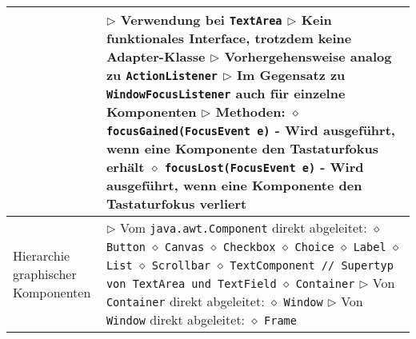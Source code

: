 \begin{longtable}{ | p{} p{} | }
	\makecell[l]{Interface FocusListener} & \makecell[l]{
	$\rhd$ Verwendung bei \texttt{TextArea} \\
	$\rhd$ Kein funktionales Interface, trotzdem keine Adapter-Klasse \\
	$\rhd$ Vorhergehensweise analog zu \texttt{ActionListener} \\
	$\rhd$ Im Gegensatz zu \texttt{WindowFocusListener} auch für einzelne Komponenten \\
	$\rhd$ Methoden: \\
	\hspace{0.4cm} $\diamond$ \texttt{focusGained(FocusEvent e)} \\ 
	\hspace{0.6cm} - Wird ausgeführt, wenn eine Komponente den Tastaturfokus erhält \\
	\hspace{0.4cm} $\diamond$ \texttt{focusLost(FocusEvent e)} \\
	\hspace{0.6cm} - Wird ausgeführt, wenn eine Komponente den Tastaturfokus verliert} \\ \hline

	\makecell[l]{Hierarchie graphischer \\ Komponenten} & \makecell[l]{
	$\rhd$ Vom \texttt{java.awt.Component} direkt abgeleitet: \\
	\hspace{0.4cm} $\diamond$ \texttt{Button} \\
	\hspace{0.4cm} $\diamond$ \texttt{Canvas} \\
	\hspace{0.4cm} $\diamond$ \texttt{Checkbox} \\
	\hspace{0.4cm} $\diamond$ \texttt{Choice} \\
	\hspace{0.4cm} $\diamond$ \texttt{Label} \\
	\hspace{0.4cm} $\diamond$ \texttt{List} \\
	\hspace{0.4cm} $\diamond$ \texttt{Scrollbar} \\
	\hspace{0.4cm} $\diamond$ \texttt{TextComponent // Supertyp von TextArea und TextField} \\
	\hspace{0.4cm} $\diamond$ \texttt{Container}
	$\rhd$ Von \texttt{Container} direkt abgeleitet: \\
	\hspace{0.4cm} $\diamond$ \texttt{Window} \\
	$\rhd$ Von \texttt{Window} direkt abgeleitet: \\
	\hspace{0.4cm} $\diamond$ \texttt{Frame} } \\ \hline



\end{longtable}
